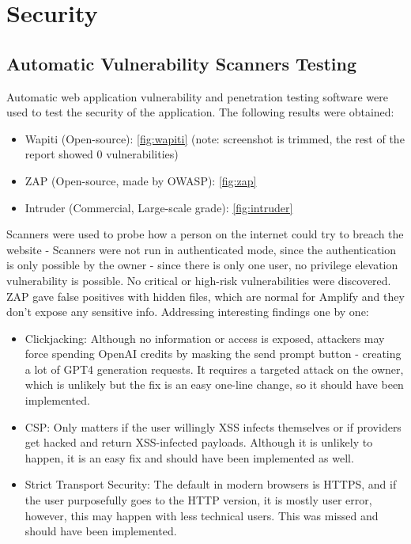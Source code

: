 \section{Security}
\subsection{Automatic Vulnerability Scanners Testing}
Automatic web application vulnerability and penetration testing software were used to test the security of the application. The following results were obtained: 
\begin{itemize}
    \item Wapiti (Open-source): \ref{fig:wapiti} (note: screenshot is trimmed, the rest of the report showed 0 vulnerabilities)
    \item ZAP (Open-source, made by OWASP): \ref{fig:zap}
    \item Intruder (Commercial, Large-scale grade): \ref{fig:intruder}
\end{itemize}
Scanners were used to probe how a person on the internet could try to breach the website - Scanners were not run in authenticated mode, since the authentication is only possible by the owner - since there is only one user, no privilege elevation vulnerability is possible. No critical or high-risk vulnerabilities were discovered. ZAP gave false positives with hidden files, which are normal for Amplify and they don't expose any sensitive info.  Addressing interesting findings one by one: 
\begin{itemize}
    \item Clickjacking: Although no information or access is exposed, attackers may force spending OpenAI credits by masking the send prompt button - creating a lot of GPT4 generation requests. It requires a targeted attack on the owner, which is unlikely but the fix is an easy one-line change, so it should have been implemented.
    \item CSP: Only matters if the user willingly XSS infects themselves or if providers get hacked and return XSS-infected payloads. Although it is unlikely to happen, it is an easy fix and should have been implemented as well. 
    \item Strict Transport Security: The default in modern browsers is HTTPS, and if the user purposefully goes to the HTTP version, it is mostly user error, however, this may happen with less technical users. This was missed and should have been implemented.
\end{itemize}
